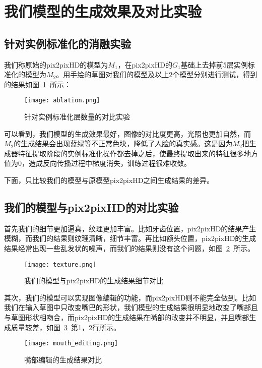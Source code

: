 \section{我们模型的生成效果及对比实验}

\subsection{针对实例标准化的消融实验}

我们称原始的pix2pixHD的模型为$M_1$，在pix2pixHD的$G_1$基础上去掉前5层实例标准化的模型为$M_2$。用手绘的草图对我们的模型及以上2个模型分别进行测试，得到的结果如图~\ref{fig:ablation}~所示：
\begin{figure}[htb]
	\centering
	\texttt{[image: ablation.png]}
	\caption{针对实例标准化层数量的对比实验}
	\label{fig:ablation}
\end{figure}

可以看到，我们模型的生成效果最好，图像的对比度更高，光照也更加自然，而$M_2$的生成结果会出现蓝绿等不正常色块，降低了人脸的真实感。这是因为$M_2$把生成器特征提取阶段的实例标准化操作都去掉之后，使最终提取出来的特征很多地方值为0，造成反向传播过程中梯度消失，训练过程很难收敛。

下面，只比较我们的模型与原模型pix2pixHD之间生成结果的差异。

\subsection{我们的模型与pix2pixHD的对比实验}

首先我们的细节更加逼真，纹理更加丰富。比如牙齿位置，pix2pixHD的结果产生模糊，而我们的结果则纹理清晰，细节丰富。再比如额头位置，pix2pixHD的生成结果经常出现一些乱发状的噪声，而我们的结果则没有这个问题，如图~\ref{fig:compare_1}~所示。
\begin{figure}[htb]
	\centering
	\texttt{[image: texture.png]}
	\caption{我们的模型与pix2pixHD的生成结果细节对比}
	\label{fig:compare_1}
\end{figure}

其次，我们的模型可以实现图像编辑的功能，而pix2pixHD则不能完全做到。比如我们在输入草图中只改变嘴巴的形状，我们模型的生成结果很明显地改变了嘴部且与草图形状相吻合，而pix2pixHD的生成结果在嘴部的改变并不明显，并且嘴部生成质量较差，如图~\ref{fig:compare_2}~第1，2行所示。
\begin{figure}[htb]
	\centering
	\texttt{[image: mouth\_editing.png]}
	\caption{嘴部编辑的生成结果对比}
	\label{fig:compare_2}
\end{figure}

